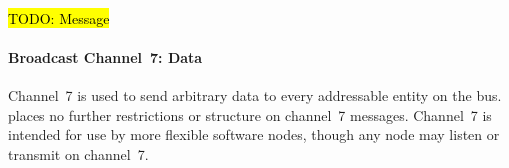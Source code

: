 ~

\hl{TODO: Message}


\paragraph{Broadcast Channel~7: Data}
\label{sec:channel-7}
Channel~7 is used to send arbitrary data to every addressable entity on the
bus. \bus places no further restrictions or structure on channel~7 messages.
Channel~7 is intended for use by more flexible software nodes, though any node
may listen or transmit on channel~7.


\begin{comment}
For a packaged system using \bus, simply providing an external {\tt DIN} and
{\tt DOUT} that is normally jumpered, plus access to the {\tt CLK} line, is
sufficient to allow transient bus elements (such as a programmer, debugger).

For completely contained systems, it is desirable to also define a bus
injection methodology that can be probed onto a chip, as well as a passive
listening method. \bus defines two additional, optional pads that may be added
to any node:

\begin{itemize}
  \item {\tt DSNOOP} -- Snoop, Data out
  \item {\tt MODE}   -- Connected?, Data in
\end{itemize}

The {\tt MODE} pad is connected to a weak pull-down resistor. During device
power-on, if the {\tt MODE} pad is found to be high, an external device is
assumed to be connected. In this case, the {\tt DIN} pad is routed to the {\tt
DSNOOP} pad and the {\tt MODE} pad is routed to the chip-internal {\tt DIN}
signal. Otherwise the {\tt MODE} pad is ignored and the chip {\tt DIN} pad
routes to both the chip-internal {\tt DIN} signal and the {\tt DSNOOP} pad.
These functions are determined during Power-On-Reset and remain fixed until a
future chip-Reset.
\end{comment}
